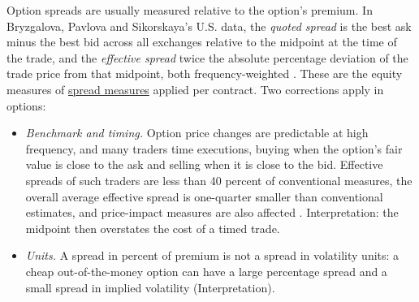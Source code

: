 \begin{qfmethod}\label{meth:option-spread-measurement}
 Option spreads are usually measured relative to the option's premium. In Bryzgalova, Pavlova and Sikorskaya's U.S. data, the \emph{quoted spread} is the best ask minus the best bid across all exchanges relative to the midpoint at the time of the trade, and the \emph{effective spread} twice the absolute percentage deviation of the trade price from that midpoint, both frequency-weighted \citep[published version, Table~I, p.~15]{ex-bryzgalova-pavlova-sikorskaya-2023}. These are the equity measures of \hyperref[def:spread-measures]{spread measures} applied per contract. Two corrections apply in options:
\begin{itemize}
\item \emph{Benchmark and timing.} Option price changes are predictable at high frequency, and many traders time executions, buying when the option's fair value is close to the ask and selling when it is close to the bid. Effective spreads of such traders are less than 40 percent of conventional measures, the overall average effective spread is one-quarter smaller than conventional estimates, and price-impact measures are also affected \citep[abstract]{wide-muravyev-pearson}. Interpretation: the midpoint then overstates the cost of a timed trade.
\item \emph{Units.} A spread in percent of premium is not a spread in volatility units: a cheap out-of-the-money option can have a large percentage spread and a small spread in implied volatility (Interpretation).
\end{itemize}


\end{qfmethod}
